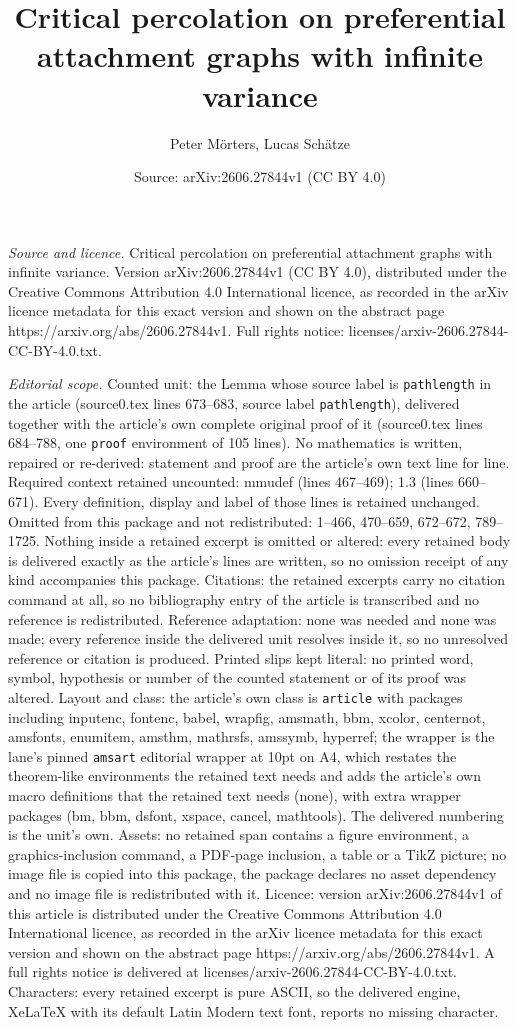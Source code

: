 \documentclass[10pt,a4paper]{amsart}
\title[Critical percolation on preferential attachment graphs with ]{Critical percolation on preferential attachment graphs with infinite variance}
\author{Peter M\"orters, Lucas Sch\"atze}
\date{Source: arXiv:2606.27844v1 (CC BY 4.0)}
\begin{document}
\maketitle

\noindent\emph{Source and licence.} Critical percolation on preferential attachment graphs with infinite variance. Version arXiv:2606.27844v1 (CC BY 4.0), distributed under the Creative Commons Attribution 4.0 International licence, as recorded in the arXiv licence metadata for this exact version and shown on the abstract page https://arxiv.org/abs/2606.27844v1. Full rights notice: licenses/arxiv-2606.27844-CC-BY-4.0.txt.\par\smallskip

\noindent\textit{Editorial scope.} Counted unit: the Lemma whose source label is \texttt{pathlength} in the article (source0.tex lines 673--683, source label \texttt{pathlength}), delivered together with the article's own complete original proof of it (source0.tex lines 684--788, one \texttt{proof} environment of 105 lines). No mathematics is written, repaired or re-derived: statement and proof are the article's own text line for line. Required context retained uncounted: mmudef (lines 467--469); 1.3 (lines 660--671). Every definition, display and label of those lines is retained unchanged. Omitted from this package and not redistributed: 1--466, 470--659, 672--672, 789--1725. Nothing inside a retained excerpt is omitted or altered: every retained body is delivered exactly as the article's lines are written, so no omission receipt of any kind accompanies this package. Citations: the retained excerpts carry no citation command at all, so no bibliography entry of the article is transcribed and no reference is redistributed. Reference adaptation: none was needed and none was made; every reference inside the delivered unit resolves inside it, so no unresolved reference or citation is produced. Printed slips kept literal: no printed word, symbol, hypothesis or number of the counted statement or of its proof was altered. Layout and class: the article's own class is \texttt{article} with packages including inputenc, fontenc, babel, wrapfig, amsmath, bbm, xcolor, centernot, amsfonts, enumitem, amsthm, mathrsfs, amssymb, hyperref; the wrapper is the lane's pinned \texttt{amsart} editorial wrapper at 10pt on A4, which restates the theorem-like environments the retained text needs and adds the article's own macro definitions that the retained text needs (none), with extra wrapper packages (bm, bbm, dsfont, xspace, cancel, mathtools). The delivered numbering is the unit's own. Assets: no retained span contains a figure environment, a graphics-inclusion command, a PDF-page inclusion, a table or a TikZ picture; no image file is copied into this package, the package declares no asset dependency and no image file is redistributed with it. Licence: version arXiv:2606.27844v1 of this article is distributed under the Creative Commons Attribution 4.0 International licence, as recorded in the arXiv licence metadata for this exact version and shown on the abstract page https://arxiv.org/abs/2606.27844v1. A full rights notice is delivered at licenses/arxiv-2606.27844-CC-BY-4.0.txt. Characters: every retained excerpt is pure ASCII, so the delivered engine, XeLaTeX with its default Latin Modern text font, reports no missing character.
\end{document}
